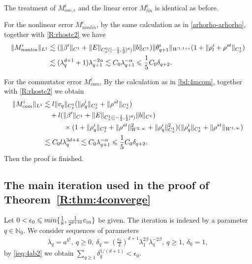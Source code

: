 \documentclass[10pt,a4paper]{amsart}
\numberwithin{equation}{section}
\def\min{{\mathord{{\rm min}}}}
\def\geq{\geqslant}
\def\leq{\leqslant}
\def\min{{\mathord{{\rm min}}}}
\def\geq{\geqslant}
\def\leq{\leqslant}
\begin{document}
The treatment of $M^i_{osc,c}$ and the linear error $M^i_{ {lin}}$ is identical as before.

For the nonlinear error $M^i_{nonlin} $, by the same calculation as in \eqref{arhorho-arhorho},  together with \eqref{R:rhostc2}  we have
\begin{align}
    \|M^i_{nonlin}\|_{L^1} 
      &\lesssim (\|\beta' \|_{C^1 }+\|E \|_{C_{x}^0([-\frac12,\frac12]^d)}\|b\|_{C^1})\|\theta^{i}_{q+1}\|_{W^{1,1+\epsilon}} (1+\|\rho^{i}_{l}+\rho^{st}\|_{C_{x}^1} ) \notag\\
      &\lesssim (\lambda_{q}^{ d+1}+1)\lambda_{q+1}^{-2\alpha} \lesssim    C_0 \lambda_{q+1}^{-\alpha}\leq \frac{1}{5}C_0 \delta_{q+2}.\notag
\end{align} 
 
 

For the commutator error $M^i_{com} $, By the calculation as in \eqref{bd:4mcom}, together with \eqref{R:rhostc2}   we obtain
 \begin{align}
  \|M^i_{ com} \|_{L^1}  & \lesssim l\|v_q\|_{C_{x}^1}(\|\rho_q^i\|_{C_{x}^1}+\|\rho^{st}\|_{C_{x}^1})\notag\\
  &\quad+l (\|\beta' \|_{C^1}+\|E \|_{C_{x}^1([-\frac12,\frac12]^d)}\|b\|_{C^1})\notag\\
  &\quad\quad\quad\times (1+  \| \rho_q^i \|_{C_{x}^2}+\|\rho^{st}\|_{W^{2,\infty}}^2+\| \rho_q^i\|_{C_{x}^1}^2)(\| \rho_q^i \|_{C_{x}^1}+\|\rho^{st}\|_{W^{1,\infty}})\notag\\
 &\lesssim C_0 l\lambda_q^{3d+4}\lesssim  C_0  \lambda_{q+1}^{-\alpha}\leq \frac{1}{5}C_0 \delta_{q+2}.\notag 
   \end{align}    
Then the proof is finished.





\subsection{The main iteration used in the proof of Theorem~\ref{R:thm:4converge}}
Let $0<\epsilon_0\leq \min\{ \frac18, \frac1 {2^{d+10}} c_{in}\}$ be given.  The iteration is indexed by a parameter
$
q\in\mathbb{N}_0.
$
We consider     sequences of parameters
\begin{align*}
\lambda_q
=
a^{b^q},
\ 
q\geq0,
\ 
\delta_q
=
(\frac{\epsilon_0}{2})^{d+1}
\lambda_1^{2\beta}
\lambda_q^{-2\beta},
\ 
q\geq1,
\ 
\delta_0=1,
\end{align*}  by \eqref{ieq:4ab2} 
we obtain $
\sum_{q\geq1}\delta_q^{1/(d+1)}
<
\epsilon_0. $
 
\end{document}
